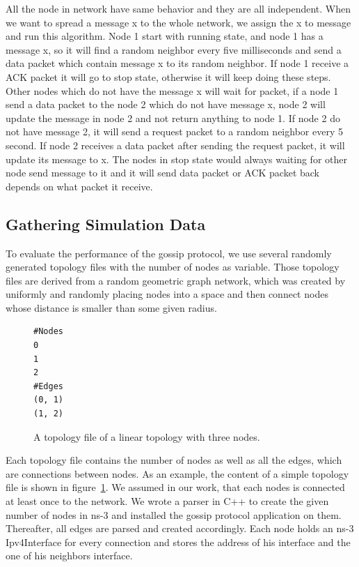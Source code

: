 \documentclass[12pt,journal]{IEEEtran}
\begin{document}
All the node in network have same behavior and they are all independent. When we want to spread a message x to the whole network, we assign the x to message and run this algorithm. Node 1 start with running state, and node 1 has a message x, so it will find a random neighbor every five milliseconds and send a data packet which contain message x to its random neighbor. If node 1 receive a ACK packet it will go to stop state, otherwise it will keep doing these steps. Other nodes which do not have the message x will wait for packet, if a node 1 send a data packet to the node 2 which do not have message x, node 2 will update the message in node 2 and not return anything to node 1. If node 2 do not have message 2, it will send a request packet to a random neighbor every 5 second. If node 2 receives a data packet after sending the request packet, it will update its message to x. The nodes in stop state would always waiting for other node send message to it and it will send data packet or ACK packet back depends on what packet it receive.

\subsection{Gathering Simulation Data}

To evaluate the performance of the gossip protocol, we use several randomly generated topology files with the number of nodes as variable. Those topology files are derived from a random geometric graph network, which was created by uniformly and randomly placing nodes into a space and then connect nodes whose distance is smaller than some given radius.

\begin{figure}
 \centering
 \begin{Verbatim}[fontsize=\small]
#Nodes
0
1
2
#Edges
(0, 1)
(1, 2)
\end{Verbatim}
 \caption{A topology file of a linear topology with three nodes.}
 \label{fig:topsimple}
\end{figure}


Each topology file contains the number of nodes as well as all the edges, which are connections between nodes. As an example, the content of a simple topology file is shown in figure~\ref{fig:topsimple}. We assumed in our work, that each nodes is connected at least once to the network. We wrote a parser in C++ to create the given number of nodes in ns-3 and installed the gossip protocol application on them. Thereafter, all edges are parsed and created accordingly. Each node holds an ns-3 Ipv4Interface for every connection and stores the address of his interface and the one of his neighbors interface.
\end{document}
